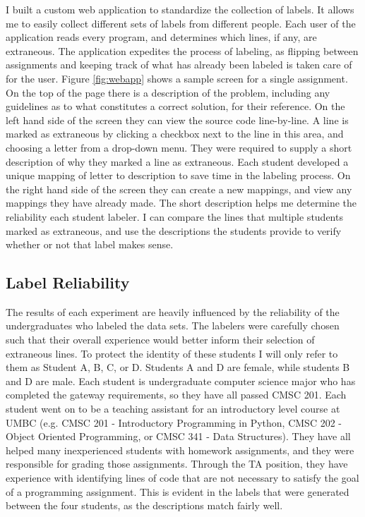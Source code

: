 I built a custom web application to standardize the collection of labels. It allows me to easily collect different sets of labels from different people. Each user of the application reads every program, and determines which lines, if any, are extraneous. The application expedites the process of labeling, as flipping between assignments and keeping track of what has already been labeled is taken care of for the user. Figure \ref{fig:webapp} shows a sample screen for a single assignment. On the top of the page there is a description of the problem, including any guidelines as to what constitutes a correct solution, for their reference. On the left hand side of the screen they can view the source code line-by-line. A line is marked as extraneous by clicking a checkbox next to the line in this area, and choosing a letter from a drop-down menu. They were required to supply a short description of why they marked a line as extraneous. Each student developed a unique mapping of letter to description to save time in the labeling process. On the right hand side of the screen they can create a new mappings, and view any mappings they have already made. The short description helps me determine the reliability each student labeler. I can compare the lines that multiple students marked as extraneous, and use the descriptions the students provide to verify whether or not that label makes sense.


\subsection{Label Reliability}

The results of each experiment are heavily influenced by the reliability of the undergraduates who labeled the data sets. The labelers were carefully chosen such that their overall experience would better inform their selection of extraneous lines. To protect the identity of these students I will only refer to them as Student A, B, C, or D. Students A and D are female, while students B and D are male. Each student is undergraduate computer science major who has completed the gateway requirements, so they have all passed CMSC 201. Each student went on to be a teaching assistant for an introductory level course at UMBC (e.g. CMSC 201 - Introductory Programming in Python, CMSC 202 - Object Oriented Programming, or CMSC 341 - Data Structures). They have all helped many inexperienced students with homework assignments, and they were responsible for grading those assignments. Through the TA position, they have experience with identifying lines of code that are not necessary to satisfy the goal of a programming assignment. This is evident in the labels that were generated between the four students, as the descriptions match fairly well.


